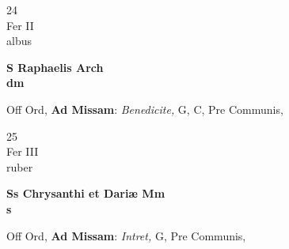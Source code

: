 \documentclass[10pt, openany]{book}
\begin{document}
        \begin{center}
            \begin{minipage}{3.5in}
                \vspace{2em}
                \begin{minipage}{0.5in}
                    {\Huge 24} \\
                    {\normalsize Fer II} \\
                    {\normalsize albus}
                \end{minipage}
                \begin{minipage}{3.0in}
                    \textbf{ \large S Raphaelis Arch \\
                    \textnormal{\normalsize dm}} \\ 
                \end{minipage}
                \begin{justify}Off Ord, \textbf{Ad Missam}: \textit{Benedicite,} G, C, Pre Communis,  
                \end{justify}
            \end{minipage}
        \end{center}
    
        \begin{center}
            \begin{minipage}{3.5in}
                \vspace{2em}
                \begin{minipage}{0.5in}
                    {\Huge 25} \\
                    {\normalsize Fer III} \\
                    {\normalsize ruber}
                \end{minipage}
                \begin{minipage}{3.0in}
                    \textbf{ \large Ss Chrysanthi et Dariæ Mm \\
                    \textnormal{\normalsize s}} \\ 
                \end{minipage}
                \begin{justify}Off Ord, \textbf{Ad Missam}: \textit{Intret,} G, Pre Communis,  
                \end{justify}
            \end{minipage}
        \end{center}
    
\end{document}
